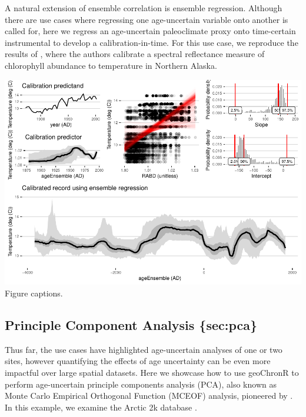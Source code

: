 \documentclass[gc, manuscript]{copernicus}
\begin{document}
A natural extension of ensemble correlation is ensemble regression.
Although there are use cases where regressing one age-uncertain variable onto another is called for, here we regress an age-uncertain paleoclimate proxy onto time-certain instrumental to develop a calibration-in-time.
For this use case, we reproduce the results of \citet{Boldt:2015}, where the authors calibrate a spectral reflectance measure of chlorophyll abundance to temperature in Northern Alaska.

\includegraphics{geoChronR-paper_files/figure-latex/unnamed-chunk-10-1.pdf}
Figure captions.

\subsection{Principle Component Analysis \{sec:pca\}}

Thus far, the use cases have highlighted age-uncertain analyses of one or two sites, however quantifying the effects of age uncertainty can be even more impactful over large spatial datasets.
Here we showcase how to use geoChronR to perform age-uncertain principle components analysis (PCA), also known as Monte Carlo Empirical Orthogonal Function (MCEOF) analysis, pioneered by \citet{anchukaitis2013mceof}.
In this example, we examine the Arctic 2k database \citep{McKayKaufman2014}.
\end{document}
